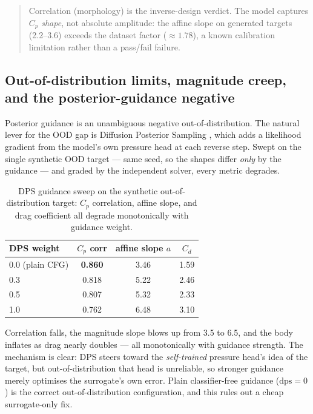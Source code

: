 \begin{quote}
  Correlation (morphology) is the inverse-design verdict. The model captures $C_p$ \emph{shape},
  not absolute amplitude: the affine slope on generated targets (2.2--3.6) exceeds the dataset
  factor ($\approx 1.78$), a known calibration limitation rather than a pass/fail failure.
\end{quote}

\subsection{Out-of-distribution limits, magnitude creep, and the posterior-guidance negative}

Posterior guidance is an unambiguous negative out-of-distribution. The natural lever for the OOD
gap is Diffusion Posterior Sampling \cite{chung2023dps}, which adds a likelihood gradient from the
model's own pressure head at each reverse step. Swept on the single synthetic OOD target --- same
seed, so the shapes differ \emph{only} by the guidance --- and graded by the independent solver,
every metric degrades.

\begin{table}[t]
  \centering
  \begin{tabular}{lccc}
    \toprule
    DPS weight & $C_p$ corr & affine slope $a$ & $C_d$ \\
    \midrule
    0.0 (plain CFG) & \textbf{0.860} & 3.46 & 1.59 \\
    0.3             & 0.818          & 5.22 & 2.46 \\
    0.5             & 0.807          & 5.32 & 2.33 \\
    1.0             & 0.762          & 6.48 & 3.10 \\
    \bottomrule
  \end{tabular}
  \caption{DPS guidance sweep on the synthetic out-of-distribution target: $C_p$ correlation,
  affine slope, and drag coefficient all degrade monotonically with guidance weight.}
  \label{tab:dps-sweep}
\end{table}

Correlation falls, the magnitude slope blows up from 3.5 to 6.5, and the body inflates as drag
nearly doubles --- all monotonically with guidance strength. The mechanism is clear: DPS steers
toward the \emph{self-trained} pressure head's idea of the target, but out-of-distribution that
head is unreliable, so stronger guidance merely optimises the surrogate's own error. Plain
classifier-free guidance ($\mathrm{dps} = 0$) is the correct out-of-distribution configuration, and
this rules out a cheap surrogate-only fix.

